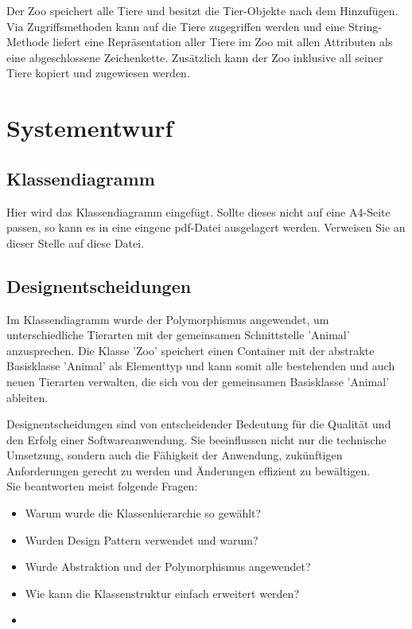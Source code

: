 \documentclass[12pt,naustrian,a4widepaper]{scrartcl}
\begin{document}
Der Zoo speichert alle Tiere und besitzt die Tier-Objekte nach dem Hinzufügen. Via Zugriffsmethoden kann auf die Tiere zugegriffen werden und eine String-Methode liefert eine Repräsentation aller Tiere im Zoo mit allen Attributen als eine abgeschlossene Zeichenkette. Zusätzlich kann der Zoo inklusive all seiner Tiere kopiert und zugewiesen werden.




\clearpage

\section{Systementwurf}

\subsection{Klassendiagramm}
\color{blue}
Hier wird das Klassendiagramm eingefügt. Sollte dieses nicht auf eine A4-Seite passen, so kann es in eine eingene pdf-Datei ausgelagert werden.
Verweisen Sie an dieser Stelle auf diese Datei.

\subsection{Designentscheidungen}
	Im Klassendiagramm wurde der Polymorphismus angewendet, um unterschiedliche Tierarten mit der gemeinsamen Schnittstelle 'Animal' anzusprechen. Die Klasse 'Zoo' speichert einen Container mit der abstrakte Basisklasse 'Animal' als Elementtyp und kann somit alle bestehenden und auch neuen Tierarten verwalten, die sich von der gemeinsamen Basisklasse 'Animal' ableiten.

\color{blue}
Designentscheidungen sind von entscheidender Bedeutung für die Qualität und den Erfolg einer Softwareanwendung. Sie beeinflussen nicht nur die technische Umsetzung, sondern auch die Fähigkeit der Anwendung, zukünftigen Anforderungen gerecht zu werden und Änderungen effizient zu bewältigen.\\
Sie beantworten meist folgende Fragen:\\
\begin{itemize}
	\item Warum wurde die Klassenhierarchie so gewählt?
	\item Wurden Design Pattern verwendet und warum?
	\item Wurde Abstraktion und der Polymorphismus angewendet?
	\item Wie kann die Klassenstruktur einfach erweitert werden?
	\item 
\end{itemize}
\end{document}
